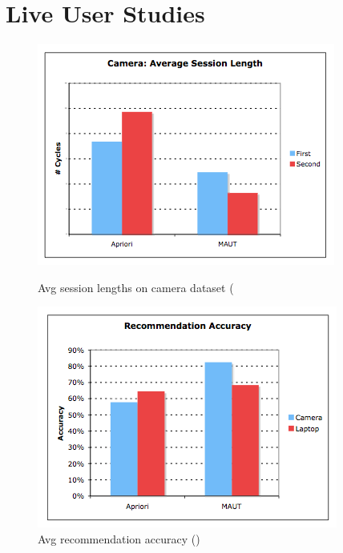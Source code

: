 \section{Live User Studies}
\label{sec:liveUser}

\begin{figure}
\centering
\begin{minipage}{.45\textwidth}
  \centering
  \includegraphics[width=1\linewidth]{figures-bharath/camera_liveUser.png}
  \caption{Avg session lengths on camera dataset (\cite{liveUserStudy}}
  \label{fig:camera_liveUser}
\end{minipage}%
\;\;\;\;\;\;
\begin{minipage}{.45\textwidth}
  \centering
  \includegraphics[width=1\linewidth]{figures-bharath/accuracy_liveUser.png}
  \caption{Avg recommendation accuracy (\cite{liveUserStudy})}
  \label{fig:accuracy_liveUser}
\end{minipage}
\end{figure}


